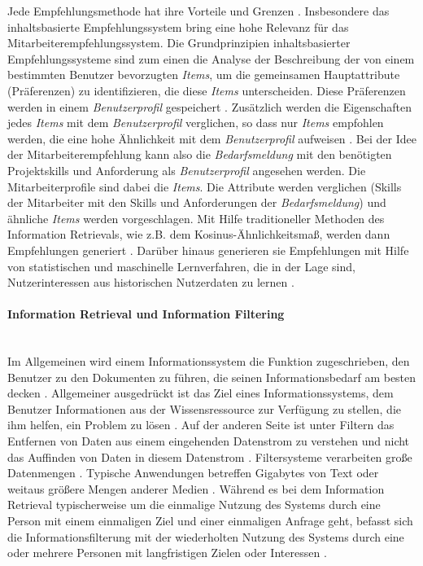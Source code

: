 Jede Empfehlungsmethode hat ihre Vorteile und Grenzen \cite{lu2020recommender}. Insbesondere das inhaltsbasierte Empfehlungssystem bring eine hohe Relevanz für das Mitarbeiterempfehlungssystem. Die Grundprinzipien inhaltsbasierter Empfehlungssysteme sind zum einen die Analyse der Beschreibung der von einem bestimmten Benutzer bevorzugten \emph{Items}, um die gemeinsamen Hauptattribute (Präferenzen) zu identifizieren, die diese \emph{Items} unterscheiden. Diese Präferenzen werden in einem \emph{Benutzerprofil} gespeichert \cite{lu2020recommender}. Zusätzlich werden die Eigenschaften jedes \emph{Items} mit dem \emph{Benutzerprofil} verglichen, so dass nur \emph{Items} empfohlen werden, die eine hohe Ähnlichkeit mit dem \emph{Benutzerprofil} aufweisen \cite{lu2020recommender}. Bei der Idee der Mitarbeiterempfehlung kann also die \emph{Bedarfsmeldung} mit den benötigten Projektskills und Anforderung als \emph{Benutzerprofil} angesehen werden. Die Mitarbeiterprofile sind dabei die \emph{Items}. Die Attribute werden verglichen (Skills der Mitarbeiter mit den Skills und Anforderungen der \emph{Bedarfsmeldung}) und ähnliche \emph{Items} werden vorgeschlagen. Mit Hilfe traditioneller Methoden des Information Retrievals, wie z.B. dem Kosinus-Ähnlichkeitsmaß, werden dann Empfehlungen generiert \cite{lu2020recommender}. Darüber hinaus generieren sie Empfehlungen mit Hilfe von statistischen und maschinelle Lernverfahren, die in der Lage sind, Nutzerinteressen aus historischen Nutzerdaten zu lernen \cite{lu2020recommender}.
\paragraph{Information Retrieval und Information Filtering}\mbox{} \\
Im Allgemeinen wird einem Informationssystem die Funktion zugeschrieben, den Benutzer zu den Dokumenten zu führen, die seinen Informationsbedarf am besten decken \cite{belkin1992information}. Allgemeiner ausgedrückt ist das Ziel eines Informationssystems, dem Benutzer Informationen aus der Wissensressource zur Verfügung zu stellen, die ihm helfen, ein Problem zu lösen \cite{belkin1992information}. Auf der anderen Seite ist unter Filtern das Entfernen von Daten aus einem eingehenden Datenstrom zu verstehen und nicht das Auffinden von Daten in diesem Datenstrom \cite{belkin1992information}. Filtersysteme verarbeiten große Datenmengen \cite{belkin1992information}. Typische Anwendungen betreffen Gigabytes von Text oder weitaus größere Mengen anderer Medien \cite{belkin1992information}. Während es bei dem Information Retrieval typischerweise um die einmalige Nutzung des Systems durch eine Person mit einem einmaligen Ziel und einer einmaligen Anfrage geht, befasst sich die Informationsfilterung mit der wiederholten Nutzung des Systems durch eine oder mehrere Personen mit langfristigen Zielen oder Interessen \cite{belkin1992information}.
